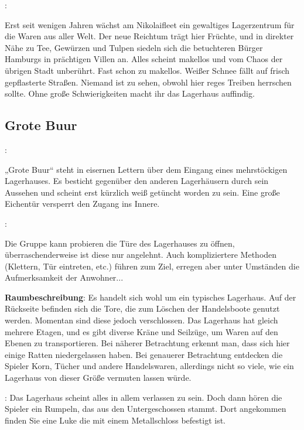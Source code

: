 :

Erst seit wenigen Jahren wächst am Nikolaifleet ein gewaltiges Lagerzentrum für die Waren aus aller Welt. Der neue Reichtum trägt hier Früchte, und in direkter Nähe zu Tee, Gewürzen und Tulpen siedeln sich die betuchteren Bürger Hamburgs in prächtigen Villen an. Alles scheint makellos und vom Chaos der übrigen Stadt unberührt. Fast schon zu makellos. Weißer Schnee fällt auf frisch gepflasterte Straßen. Niemand ist zu sehen, obwohl hier reges Treiben herrschen sollte. Ohne große Schwierigkeiten macht ihr das Lagerhaus auffindig.


\subsection*{Grote Buur}
\label{"grote buur"}

:

„Grote Buur“ steht in eisernen Lettern über dem Eingang eines mehrstöckigen Lagerhauses. Es besticht gegenüber den anderen Lagerhäusern durch sein Aussehen und scheint erst kürzlich weiß getüncht worden zu sein. Eine große Eichentür versperrt den Zugang ins Innere.

:

Die Gruppe kann probieren die Türe des Lagerhauses zu öffnen, überraschenderweise ist diese nur angelehnt. Auch kompliziertere Methoden (Klettern, Tür eintreten, etc.) führen zum Ziel, erregen aber unter Umständen die Aufmerksamkeit der Anwohner...

\textbf{Raumbeschreibung}: Es handelt sich wohl um ein typisches Lagerhaus. Auf der Rückseite befinden sich die Tore, die zum Löschen der Handelsboote genutzt werden. Momentan sind diese jedoch verschlossen. Das Lagerhaus hat gleich mehrere Etagen, und es gibt diverse Kräne und Seilzüge, um Waren auf den Ebenen zu transportieren. Bei näherer Betrachtung erkennt man, dass sich hier einige Ratten niedergelassen haben. Bei genauerer Betrachtung entdecken die Spieler Korn, Tücher und andere Handelswaren, allerdings nicht so viele, wie ein Lagerhaus von dieser Größe vermuten lassen würde.

: Das Lagerhaus scheint alles in allem verlassen zu sein. Doch dann hören die Spieler ein Rumpeln, das aus den Untergeschossen stammt. Dort angekommen finden Sie eine Luke die mit einem Metallschloss befestigt ist.


